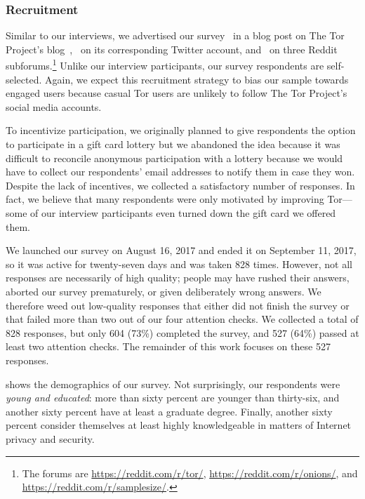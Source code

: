 \subsubsection{Recruitment}

Similar to our interviews, we advertised our survey \first~in a blog post on The
Tor Project's blog~\cite{Winter2017a}, \second~on its corresponding Twitter
account, and \third~on three Reddit subforums.\footnote{The forums are
\url{https://reddit.com/r/tor/}, \url{https://reddit.com/r/onions/}, and
\url{https://reddit.com/r/samplesize/}.}  Unlike our interview participants,
our survey respondents are self-selected.  Again, we expect this recruitment
strategy to bias our sample towards engaged users because casual Tor users are
unlikely to follow The Tor Project's social media accounts.

To incentivize participation, we originally planned to give respondents the
option to participate in a gift card lottery but we abandoned the idea because
it was difficult to reconcile anonymous participation with a lottery because we
would have to collect our respondents' email addresses to notify them in case
they won.  Despite the lack of incentives, we collected a satisfactory number of
responses.  In fact, we believe that many respondents were only motivated by
improving Tor---some of our interview participants even turned down the gift
card we offered them.

We launched our survey on August 16, 2017 and ended it on September 11, 2017, so
it was active for twenty-seven days and was taken 828 times.  However, not all
responses are necessarily of high quality; people may have rushed their answers,
aborted our survey prematurely, or given deliberately wrong answers.  We
therefore weed out low-quality responses that either did not finish the survey
or that failed more than two out of our four attention checks.  We collected a
total of 828 responses, but only 604 (73\%) completed the survey, and 527 (64\%)
passed at least two attention checks.  The remainder of this work focuses on
these 527 responses.

 shows the demographics of our survey.  Not
surprisingly, our respondents were \emph{young and educated}: more than sixty
percent are younger than thirty-six, and another sixty percent have at least a
graduate degree.  Finally, another sixty percent consider themselves at least
highly knowledgeable in matters of Internet privacy and security.

